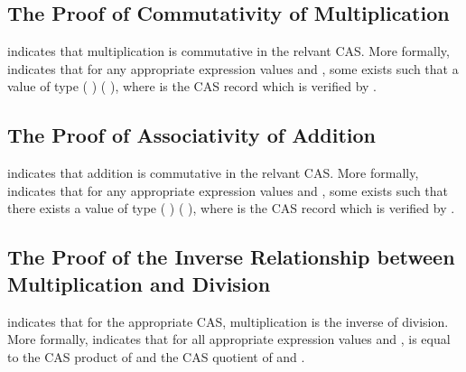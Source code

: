 \documentclass{report}
\begin{document}
\subsection{The Proof of Commutativity of Multiplication}
 indicates that multiplication is commutative in the relvant CAS.  More formally,   indicates that for any appropriate expression values  and , some  exists such that a value of type   \AgdaSymbol(   \AgdaSymbol) \AgdaSymbol(   \AgdaSymbol), where  is the CAS record which is verified by .

\subsection{The Proof of Associativity of Addition}
 indicates that addition is commutative in the relvant CAS.  More formally,   indicates that for any appropriate expression values  and , some  exists such that there exists a value of type   \AgdaSymbol(   \AgdaSymbol) \AgdaSymbol(   \AgdaSymbol), where  is the CAS record which is verified by .


\subsection{The Proof of the Inverse Relationship between Multiplication and Division}
 indicates that for the appropriate CAS, multiplication is the inverse of division.  More formally,   indicates that for all appropriate expression values  and ,  is equal to the  CAS product of  and the  CAS quotient of  and .
\end{document}
